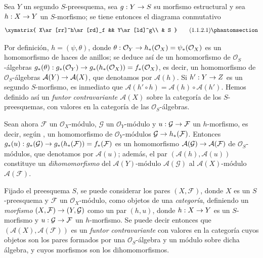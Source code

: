 \documentclass[oneside,10pt]{amsart}
\makeatletter
\newcommand{\ega@arrow}[2]{\mathchoice{#1}{#2}{#2}{#2}}
\renewcommand{\to}{\ega@arrow{\longrightarrow}{\rightarrow}}
\let\EGAOriginalLabel\label
\renewcommand{\label}[1]{\phantomsection\EGAOriginalLabel{#1}}
\makeatother
\begin{document}
\begin{env}[1.1.2]
\label{II.1.1.2-fr}
Sea $Y$ un segundo $S$-preesquema, sea $g:Y\to S$ su morfismo estructural y sea $h:X\to Y$ un $S$-morfismo; se tiene entonces el diagrama conmutativo
\[
  \xymatrix{
    X\ar[rr]^h\ar[rd]_f && Y\ar[ld]^g\\
    & S
  }
  \tag{1.1.2.1}\label{II.1.1.2.1-fr}
\]

Por definición, $h=(\psi,\theta)$, donde $\theta:\mathcal{O}_Y\to h_*(\mathcal{O}_X)=\psi_*(\mathcal{O}_X)$ es un homomorfismo de haces de anillos; se deduce así de  un homomorfismo de $\mathcal{O}_S$-álgebras $g_*(\theta):g_*(\mathcal{O}_Y)\to g_*(h_*(\mathcal{O}_X))=f_*(\mathcal{O}_X)$, es decir, un homomorfismo de $\mathcal{O}_S$-álgebras $\mathcal{A}(Y)\to\mathcal{A}(X)$, que denotamos por $\mathcal{A}(h)$.
Si $h':Y\to Z$ es un segundo $S$-morfismo, es inmediato que $\mathcal{A}(h'\circ h)=\mathcal{A}(h)\circ\mathcal{A}(h')$.
Hemos definido así un \emph{funtor contravariante $\mathcal{A}(X)$} sobre la categoría de los $S$-preesquemas, con valores en la categoría de las $\mathcal{O}_S$-álgebras.

Sean ahora $\mathcal{F}$ un $\mathcal{O}_X$-módulo, $\mathcal{G}$ un $\mathcal{O}_Y$-módulo y $u:\mathcal{G}\to\mathcal{F}$ un $h$-morfismo, es decir, según , un homomorfismo de $\mathcal{O}_Y$-módulos $\mathcal{G}\to h_*(\mathcal{F})$.
Entonces $g_*(u):g_*(\mathcal{G})\to g_*(h_*(\mathcal{F}))=f_*(\mathcal{F})$ es un homomorfismo $\mathcal{A}(\mathcal{G})\to
\mathcal{A}(\mathcal{F})$ de $\mathcal{O}_S$-módulos, que denotamos por $\mathcal{A}(u)$; además, el par $(\mathcal{A}(h),\mathcal{A}(u))$ constituye un \emph{dihomomorfismo} del $\mathcal{A}(Y)$-módulo $\mathcal{A}(\mathcal{G})$ al $\mathcal{A}(X)$-módulo $\mathcal{A}(\mathcal{F})$.
\end{env}

\begin{env}[1.1.3]
\label{II.1.1.3-fr}
Fijado el preesquema $S$, se puede considerar los pares $(X,\mathcal{F})$, donde $X$ es un $S$-preesquema y $\mathcal{F}$ un $\mathcal{O}_X$-módulo, como objetos de una \emph{categoría}, definiendo un \emph{morfismo} $(X,\mathcal{F})\to(Y,\mathcal{G})$ como un par $(h,u)$, donde $h:X\to Y$ es un $S$-morfismo y $u:\mathcal{G}\to\mathcal{F}$ un $h$-morfismo.
Se puede decir entonces que $(\mathcal{A}(X),\mathcal{A}(\mathcal{F}))$ es un \emph{funtor contravariante} con valores en la categoría cuyos objetos son los pares formados por una $\mathcal{O}_S$-álgebra y un módulo sobre dicha álgebra, y cuyos morfismos son los dihomomorfismos.
\end{env}
\end{document}
